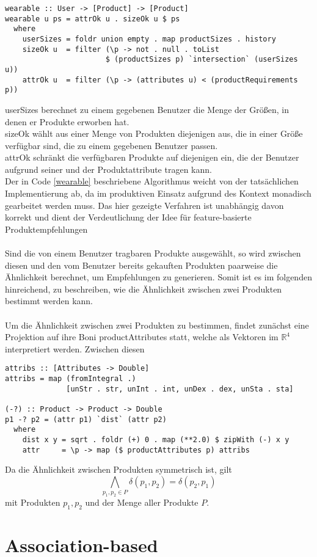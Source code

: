 \begin{lstlisting}[label=wearable,caption={Algorithmus zur Bestimmung von Produkten, die ein Benutzer tragen kann}]
wearable :: User -> [Product] -> [Product]
wearable u ps = attrOk u . sizeOk u $ ps
  where
    userSizes = foldr union empty . map productSizes . history
    sizeOk u  = filter (\p -> not . null . toList 
                       $ (productSizes p) `intersection` (userSizes u))
    attrOk u  = filter (\p -> (attributes u) < (productRequirements p))
\end{lstlisting}
\textsf{userSizes} berechnet zu einem gegebenen Benutzer die Menge der Größen, in denen er Produkte erworben hat. \\
\textsf{sizeOk} wählt aus einer Menge von Produkten diejenigen aus, die in einer Größe verfügbar sind, die zu einem gegebenen Benutzer passen.\\
\textsf{attrOk} schränkt die verfügbaren Produkte auf diejenigen ein, die der Benutzer aufgrund seiner und der Produktattribute tragen kann.
\\
Der in Code \ref{wearable} beschriebene Algorithmus weicht von der tatsächlichen Implementierung ab, da im produktiven Einsatz aufgrund des Kontext monadisch gearbeitet werden muss. Das hier gezeigte Verfahren ist unabhängig davon korrekt und dient der Verdeutlichung der Idee für feature-basierte Produktempfehlungen\\
\\
Sind die von einem Benutzer tragbaren Produkte ausgewählt, so wird zwischen diesen und den vom Benutzer bereits gekauften Produkten paarweise die Ähnlichkeit berechnet, um Empfehlungen zu generieren. Somit ist es im folgenden hinreichend, zu be\-schrei\-ben, wie die Ähnlichkeit zwischen zwei Produkten bestimmt werden kann.\\
\\
Um die Ähnlichkeit zwischen zwei Produkten zu bestimmen, findet zunächst eine Projektion auf ihre Boni \textsf{productAttributes} statt, welche als Vektoren im $\mathbb{R}^4$ interpretiert werden. Zwischen diesen 

\begin{lstlisting}[label=wearable,caption={Algorithmus zur Bestimmung von Produkten, die ein Benutzer tragen kann}]
attribs :: [Attributes -> Double]
attribs = map (fromIntegral .)
              [unStr . str, unInt . int, unDex . dex, unSta . sta]

(-?) :: Product -> Product -> Double
p1 -? p2 = (attr p1) `dist` (attr p2)
  where
    dist x y = sqrt . foldr (+) 0 . map (**2.0) $ zipWith (-) x y
    attr     = \p -> map ($ productAttributes p) attribs
\end{lstlisting}
Da die Ähnlichkeit zwischen Produkten symmetrisch ist, gilt 
\begin{equation}
  \bigwedge_{p_1, p_2 \in P} \delta\left(p_1, p_2\right) = \delta\left(p_2, p_1\right)
\end{equation}
mit Produkten $p_1, p_2$ und der Menge aller Produkte $P$.

\section{Association-based}
\lipsum[1-4]